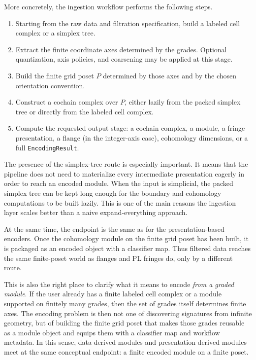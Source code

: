 \documentclass[11pt]{article}
\theoremstyle{definition}
\theoremstyle{remark}
\begin{document}
More concretely, the ingestion workflow performs the following steps.
\begin{enumerate}[label=(\roman*)]
	\item Starting from the raw data and filtration specification, build a labeled cell complex or a simplex tree.
	\item Extract the finite coordinate axes determined by the grades.  Optional quantization, axis policies, and coarsening may be applied at this stage.
	\item Build the finite grid poset $P$ determined by those axes and by the chosen orientation convention.
	\item Construct a cochain complex over $P$, either lazily from the packed simplex tree or directly from the labeled cell complex.
	\item Compute the requested output stage: a cochain complex, a module, a fringe presentation, a flange (in the integer-axis case), cohomology dimensions, or a full \texttt{EncodingResult}.
\end{enumerate}

The presence of the simplex-tree route is especially important.  It means that the pipeline does not need to materialize every intermediate presentation eagerly in order to reach an encoded module.  When the input is simplicial, the packed simplex tree can be kept long enough for the boundary and cohomology computations to be built lazily.  This is one of the main reasons the ingestion layer scales better than a naive expand-everything approach.

At the same time, the endpoint is the same as for the presentation-based encoders.  Once the cohomology module on the finite grid poset has been built, it is packaged as an encoded object with a classifier map.  Thus filtered data reaches the same finite-poset world as flanges and PL fringes do, only by a different route.

This is also the right place to clarify what it means to encode \emph{from a graded module}.  If the user already has a finite labeled cell complex or a module supported on finitely many grades, then the set of grades itself determines finite axes.  The encoding problem is then not one of discovering signatures from infinite geometry, but of building the finite grid poset that makes those grades reusable as a module object and equips them with a classifier map and workflow metadata.  In this sense, data-derived modules and presentation-derived modules meet at the same conceptual endpoint: a finite encoded module on a finite poset.
\end{document}
